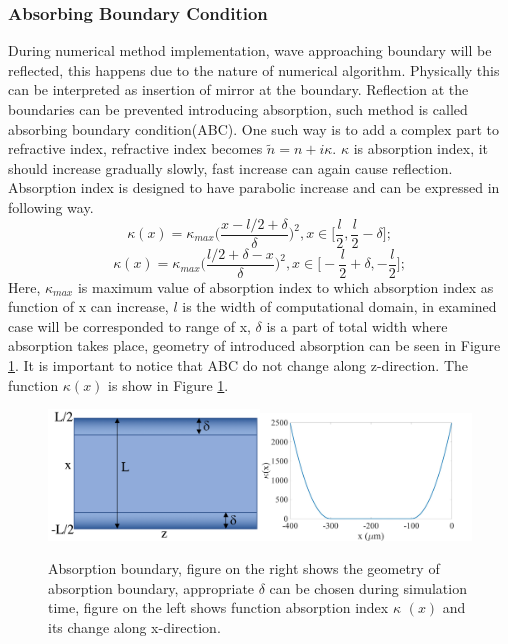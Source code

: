 \documentclass[a4paper]{article}
\begin{document}
	\subsubsection{Absorbing Boundary Condition}
	During numerical method implementation, wave approaching boundary will be reflected, this happens due to the nature of numerical algorithm. Physically this can be interpreted as insertion of mirror at the boundary. Reflection at the boundaries can be prevented introducing absorption, such method is called absorbing boundary condition(ABC). One such way is to add a complex part to refractive index, refractive index becomes $\tilde{n} = n+i\kappa$. $\kappa$  is absorption index, it should increase gradually slowly, fast increase can again cause reflection. Absorption index is designed to have parabolic increase and can be expressed in following way.
	\[\kappa(x)=\kappa_{max}\bigg(\frac{x-l/2+\delta}{\delta}\bigg)^2, x\in \bigg[\frac{l}{2},\frac{l}{2}-\delta\bigg];\]
	\[\kappa(x)=\kappa_{max}\bigg(\frac{l/2+\delta-x}{\delta}\bigg)^2, x\in \bigg[-\frac{l}{2}+\delta,-\frac{l}{2}\bigg];\]
	Here, $\kappa_{max}$ is maximum value of absorption index to which absorption index as function of x can increase, $l$ is the width of computational domain, in examined case will be corresponded to range of x, $\delta$ is a part of total width where absorption takes place, geometry of introduced absorption can be seen in Figure \ref{fig:Absorption}. It is important to notice that ABC do not change along z-direction. The function $\kappa (x)$ is show in Figure \ref{fig:Absorption}\cite{pedrola2015beam}.
	\begin{figure}[h!]
		\centering 
		\includegraphics[width=0.5\textwidth]{sketchN1.png}\includegraphics[width=0.5\textwidth]{N2.jpg}
		\caption{\label{fig:Absorption}Absorption boundary, figure on the right shows the geometry of absorption boundary, appropriate $\delta$ can be chosen during simulation time, figure on the left shows function absorption index $\kappa$ $ (x) $ and its change along x-direction.}
	\end{figure}
\end{document}
